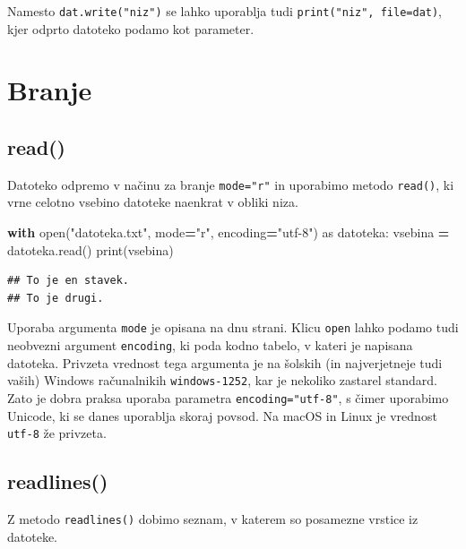 \documentclass[
]{report}
\newenvironment{Shaded}{\begin{snugshade}}{\end{snugshade}}
\newcommand{\BuiltInTok}[1]{#1}
\newcommand{\ControlFlowTok}[1]{\textcolor[rgb]{0.13,0.29,0.53}{\textbf{#1}}}
\newcommand{\ImportTok}[1]{#1}
\newcommand{\NormalTok}[1]{#1}
\newcommand{\OperatorTok}[1]{\textcolor[rgb]{0.81,0.36,0.00}{\textbf{#1}}}
\newcommand{\StringTok}[1]{\textcolor[rgb]{0.31,0.60,0.02}{#1}}
\begin{document}
Namesto \texttt{dat.write("niz")} se lahko uporablja tudi \texttt{print("niz",\ file=dat)}, kjer
odprto datoteko podamo kot parameter.

\hypertarget{branje}{%
\section{Branje}\label{branje}}

\hypertarget{read}{%
\subsection{read()}\label{read}}

Datoteko odpremo v načinu za branje \texttt{mode="r"} in uporabimo metodo \texttt{read()},
ki vrne celotno vsebino datoteke naenkrat v obliki niza.

\begin{Shaded}
\begin{Highlighting}[]
\ControlFlowTok{with} \BuiltInTok{open}\NormalTok{(}\StringTok{"datoteka.txt"}\NormalTok{, mode}\OperatorTok{=}\StringTok{"r"}\NormalTok{, encoding}\OperatorTok{=}\StringTok{"utf{-}8"}\NormalTok{) }\ImportTok{as}\NormalTok{ datoteka:}
\NormalTok{    vsebina }\OperatorTok{=}\NormalTok{ datoteka.read()}
\BuiltInTok{print}\NormalTok{(vsebina)}
\end{Highlighting}
\end{Shaded}

\begin{verbatim}
## To je en stavek.
## To je drugi.
\end{verbatim}

Uporaba argumenta \texttt{mode} je opisana na dnu strani.
Klicu \texttt{open} lahko podamo tudi neobvezni argument \texttt{encoding}, ki poda kodno
tabelo, v kateri je napisana datoteka. Privzeta vrednost tega argumenta je na
šolskih (in najverjetneje tudi vaših) Windows računalnikih \texttt{windows-1252}, kar je
nekoliko zastarel standard. Zato je dobra praksa uporaba parametra
\texttt{encoding="utf-8"}, s čimer uporabimo Unicode, ki se danes
uporablja skoraj povsod. Na macOS in Linux je vrednost \texttt{utf-8} že privzeta.

\hypertarget{readlines}{%
\subsection{readlines()}\label{readlines}}

Z metodo \texttt{readlines()} dobimo seznam, v katerem so posamezne
vrstice iz datoteke.
\end{document}
